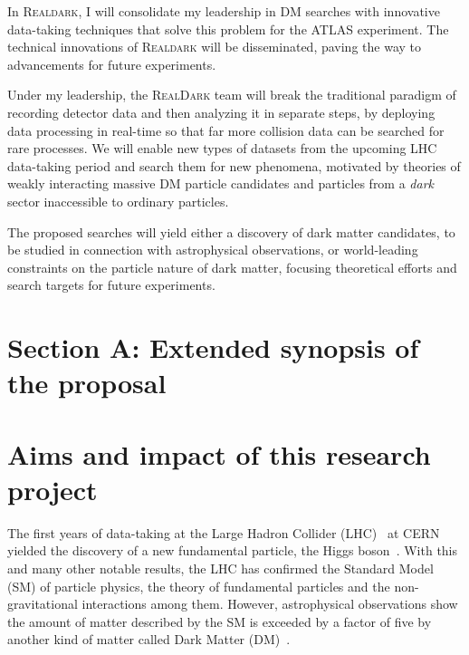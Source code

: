 \documentclass[11pt,a4paper]{article}
\begin{document}
In \textsc{Realdark}, I will consolidate my leadership in DM searches with innovative data-taking techniques that solve this problem for the ATLAS experiment. The technical innovations of \textsc{Realdark} will be disseminated, paving the way to advancements for future experiments.

Under my leadership, the \textsc{RealDark} team will break the traditional paradigm of recording detector data and then analyzing it in separate steps, by deploying data processing in real-time so that far more collision data can be searched for rare processes. 
We will enable new types of datasets from the upcoming LHC data-taking period and search them for new phenomena, motivated by theories of weakly interacting massive DM particle candidates and particles from a \textit{dark} sector inaccessible to ordinary particles. 

The proposed searches will yield either a discovery of dark matter candidates, to be studied in connection with astrophysical observations, or world-leading constraints on the particle nature of dark matter, focusing theoretical efforts and search targets for future experiments.  

\clearpage

\section*{Section A: Extended synopsis of the proposal} 

\medskip

\section{Aims and impact of this research project} 
\smallskip


The first years of data-taking at the Large Hadron Collider (LHC)~\cite{LHC2008} at CERN yielded the discovery of a new fundamental particle, the Higgs boson~\cite{Khachatryan:2016vau}. With this and many other notable results, the LHC has confirmed the Standard Model (SM) of particle physics, the theory of fundamental particles and the non-gravitational interactions among them. 
However, astrophysical observations show the amount of matter described by the SM is exceeded by a factor of five by another kind of matter called Dark Matter (DM)~\cite{Bertone:2016nfn}. 
\end{document}
